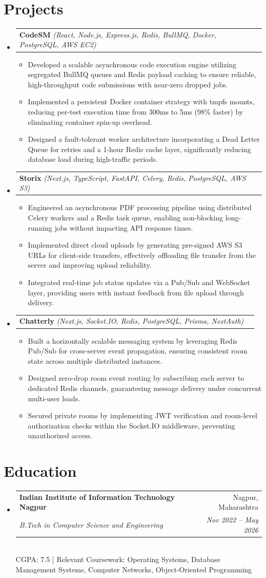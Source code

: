 \documentclass[letterpaper,10pt]{article}
\makeatletter
\newenvironment{resumeList}{
  \begin{itemize}[leftmargin=0.15in, label={}]
}{
  \end{itemize}
}
\newcommand{\resumeItem}[1]{
  \item\small{
    {#1 \vspace{-2.5pt}}
  }
}
\newcommand{\resumeSubheading}[4]{
  \vspace{-2pt}\item
    \begin{tabular*}{0.97\textwidth}[t]{l@{\extracolsep{\fill}}r}
      \textbf{#1} & #2 \\
      \textit{\small#3} & \textit{\small #4} \\
    \end{tabular*}\vspace{-6pt}
}
\newcommand{\resumeProjectHeading}[3]{
  \vspace{-2pt}\item
    \begin{tabular*}{0.97\textwidth}[t]{l@{\extracolsep{\fill}}r}
      \textbf{#1} \textit{\small(#2)} & #3 \\
    \end{tabular*}\vspace{-6pt}
}
\newcommand{\resumeItemListStart}{\begin{itemize}[leftmargin=0.15in]}
\newcommand{\resumeItemListEnd}{\end{itemize}\vspace{-5pt}}
\makeatother
\begin{document}
\section{Projects}
\begin{resumeList}
    \resumeProjectHeading
    {CodeSM}{React, Node.js, Express.js, Redis, BullMQ, Docker, PostgreSQL, AWS EC2}{}
  \resumeItemListStart
    \resumeItem{Developed a scalable asynchronous code execution engine utilizing segregated BullMQ queues and Redis payload caching to ensure reliable, high-throughput code submissions with near-zero dropped jobs.}
    \resumeItem{Implemented a persistent Docker container strategy with tmpfs mounts, reducing per-test execution time from 300ms to 5ms (98\% faster) by eliminating container spin-up overhead.}
    \resumeItem{Designed a fault-tolerant worker architecture incorporating a Dead Letter Queue for retries and a 1-hour Redis cache layer, significantly reducing database load during high-traffic periods.}
  \resumeItemListEnd

  \resumeProjectHeading
    {Storix}{Next.js, TypeScript, FastAPI, Celery, Redis, PostgreSQL, AWS S3}{}
  \resumeItemListStart
    \resumeItem{Engineered an asynchronous PDF processing pipeline using distributed Celery workers and a Redis task queue, enabling non-blocking long-running jobs without impacting API response times.}
    \resumeItem{Implemented direct cloud uploads by generating pre-signed AWS S3 URLs for client-side transfers, effectively offloading file transfer from the server and improving upload reliability.}
    \resumeItem{Integrated real-time job status updates via a Pub/Sub and WebSocket layer, providing users with instant feedback from file upload through delivery.}
  \resumeItemListEnd

  \resumeProjectHeading
    {Chatterly}{Next.js, Socket.IO, Redis, PostgreSQL, Prisma, NextAuth}{}
  \resumeItemListStart
    \resumeItem{Built a horizontally scalable messaging system by leveraging Redis Pub/Sub for cross-server event propagation, ensuring consistent room state across multiple distributed instances.}
    \resumeItem{Designed zero-drop room event routing by subscribing each server to dedicated Redis channels, guaranteeing message delivery under concurrent multi-user loads.}
    \resumeItem{Secured private rooms by implementing JWT verification and room-level authorization checks within the Socket.IO middleware, preventing unauthorized access.}
  \resumeItemListEnd
\end{resumeList}

\section{Education}
\begin{resumeList}
    \resumeSubheading
    {Indian Institute of Information Technology Nagpur}{Nagpur, Maharashtra}
    {B.Tech in Computer Science and Engineering}{Nov 2022 – May 2026}
    \vspace{2pt}\\
    \small{CGPA: 7.5 | Relevant Coursework: Operating Systems, Database Management Systems, Computer Networks, Object-Oriented Programming}
\end{resumeList}
\end{document}
